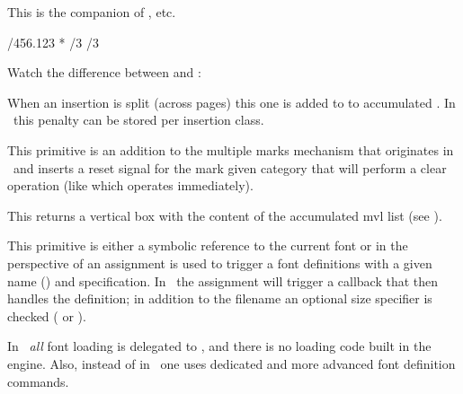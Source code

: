 \stopnewprimitive

\startnewprimitive[title={\prm {floatexpr}}]

This is the companion of ,  etc.

\startbuffer
{}
\the   {}/456.123     \relax
\the   {}*\scratchcounter \relax
\the   \floatexpr \scratchcounter/3   \relax
\number\floatexpr \scratchcounter/3   \relax
\stopbuffer

\typebuffer

Watch the difference between  and :

\startlines \getbuffer \stoplines

\stopnewprimitive

\startoldprimitive[title={\prm {floatingpenalty}}]

When an insertion is split (across pages) this one is added to to accumulated
. In \LUAMETATEX\ this penalty can be stored per insertion
class.

\stopoldprimitive

\startnewprimitive[title={\prm {flushmarks}}]

This primitive is an addition to the multiple marks mechanism that originates in
\ETEX\ and inserts a reset signal for the mark given category that will perform a
clear operation (like  which operates immediately).

\stopnewprimitive

\startnewprimitive[title={\prm {flushmvl}}]

This returns a vertical box with the content of the accumulated mvl list (see
).

\stopnewprimitive

\startoldprimitive[title={\prm {font}}]

This primitive is either a symbolic reference to the current font or in the
perspective of an assignment is used to trigger a font definitions with a given
name () and specification. In \LUAMETATEX\ the assignment will trigger
a callback that then handles the definition; in addition to the filename an
optional size specifier is checked ( or ).

In \LUAMETATEX\ {\em all} font loading is delegated to \LUA, and there is no
loading code built in the engine. Also, instead of  in \CONTEXT\ one
uses dedicated and more advanced font definition commands.

